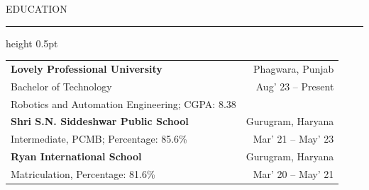 \documentclass[10pt,a4paper]{article}
\newcommand{\resumeheading}[1]{
    \vspace{6pt}
    {\large\color{resblue} #1}
    \vspace{1pt}
    {\color{resblue}\hrule height 0.5pt}
    \vspace{4pt}
}
\begin{document}
\resumeheading{EDUCATION}

\begin{tabularx}{\textwidth}{@{}X r@{}}
\textbf{\color{resblue} Lovely Professional University} & Phagwara, Punjab \\
Bachelor of Technology & Aug' 23 -- Present \\
Robotics and Automation Engineering; CGPA: 8.38 & \\[3pt]
\textbf{\color{resblue} Shri S.N. Siddeshwar Public School} & Gurugram, Haryana \\
Intermediate, PCMB; Percentage: 85.6\% & Mar' 21 -- May' 23 \\[3pt]
\textbf{\color{resblue} Ryan International School} & Gurugram, Haryana \\
Matriculation, Percentage: 81.6\% & Mar' 20 -- May' 21
\end{tabularx}
\end{document}
